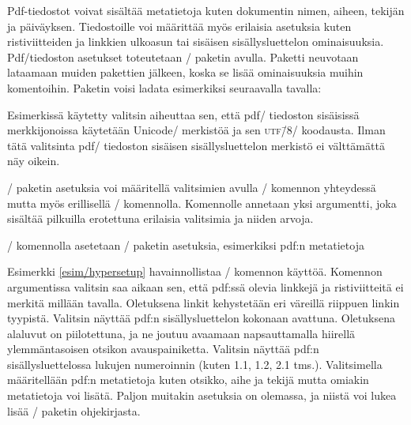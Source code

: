 Pdf-tiedostot voivat sisältää metatietoja kuten dokumentin nimen,
aiheen, tekijän ja päiväyksen. Tiedostoille voi määrittää myös erilaisia
asetuksia kuten ristiviitteiden ja linkkien ulkoasun tai sisäisen
sisällysluettelon ominaisuuksia. Pdf\-/tiedoston asetukset toteutetaan
\-/ paketin avulla. Paketti neuvotaan lataamaan
muiden pakettien jälkeen, koska se lisää ominaisuuksia muihin
komentoihin. Paketin voisi ladata esimerkiksi seuraavalla tavalla:

\begin{koodilohkosis}
\usepackage[unicode]{hyperref}
\end{koodilohkosis}

\noindent
Esimerkissä käytetty valitsin  aiheuttaa sen, että pdf\-/
tiedoston sisäisissä merkkijonoissa käytetään Unicode\-/ merkistöä ja
sen \textsc{utf\=/8}\-/ koodausta. Ilman tätä valitsinta pdf\-/
tiedoston sisäisen sisällysluettelon merkistö ei välttämättä näy oikein.

\-/ paketin asetuksia voi määritellä valitsimien
avulla \-/ komennon yhteydessä mutta myös
erillisellä \-/ komennolla. Komennolle annetaan
yksi argumentti, joka sisältää pilkuilla erotettuna erilaisia valitsimia
ja niiden arvoja.

\begin{esimerkki*}

\begin{koodilohko}
\end{koodilohko}
  \caption{\-/ komennolla asetetaan
    \-/ paketin asetuksia, esimerkiksi pdf:n
    metatietoja}
  \label{esim/hypersetup}
\end{esimerkki*}

Esimerkki \ref{esim/hypersetup} havainnollistaa \-/
komennon käyttöä. Komennon argumentissa valitsin  saa
aikaan sen, että pdf:ssä olevia linkkejä ja ristiviitteitä ei merkitä
millään tavalla. Oletuksena linkit kehystetään eri väreillä riippuen
linkin tyypistä. Valitsin  näyttää pdf:n
sisällysluettelon kokonaan avattuna. Oletuksena alaluvut on
piilotettuna, ja ne joutuu avaamaan napsauttamalla hiirellä
ylemmäntasoisen otsikon avauspainiketta. Valitsin
 näyttää pdf:n sisällysluettelossa lukujen
numeroinnin (kuten 1.1, 1.2, 2.1 tms.). Valitsimella 
määritellään pdf:n metatietoja kuten otsikko, aihe ja tekijä mutta
omiakin metatietoja voi lisätä. Paljon muitakin asetuksia on olemassa,
ja niistä voi lukea lisää \-/ paketin ohjekirjasta.

